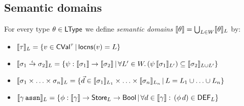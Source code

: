 \documentclass[12pt,a4paper]{report}
\newcommand{\CVal}{\sstyle{CVal}}
\newcommand{\ssto}{\nstyle{sto}}
\newcommand{\DEF}{\sstyle{DEF}}
\begin{document}



\subsection{Semantic domains}

\begin{definition}
  For every type $\theta\in\mathsf{LType}$ we define {\em semantic domains}
  $\llbracket\theta\rrbracket = \bigcup_{L \in W} \llbracket\theta\rrbracket_L$ by:
  \begin{itemize}
    \item $\semantic{\tau}_L = \{v\in\CVal^\tau\,|\,\locns{v} = L\}$
    \item $\llbracket\sigma_1\stackrel{_t}{\to}\sigma_2\rrbracket_L = \{\psi: \llbracket\sigma_1\rrbracket \to \llbracket\sigma_2\rrbracket\,|\,
              \forall L'\in W.\,(\psi\,\llbracket\sigma_1\rrbracket_{L'}) \subseteq \llbracket\sigma_2\rrbracket_{L \cup L'}\}$
    \item $\llbracket\sigma_1 \times \ldots \times \sigma_n\rrbracket_L =
      \{\vec{d} \in \llbracket\sigma_1\rrbracket_{L_1} \times \ldots \times \llbracket\sigma_n\rrbracket_{L_n}\,|\,
      L = L_1 \cup \ldots \cup L_n\}$
    \item $\semantic{\gamma\,\tassn}_L =
      \{\phi:\semantic{\gamma}\to\Store_L \to \Bool\,|\,\forall d\in \semantic\gamma:\,(\phi\,d)\in\DEF_L\}$
  \end{itemize}
\end{definition}
\end{document}
